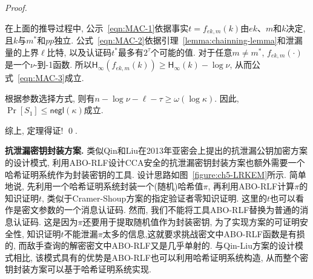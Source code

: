 \begin{proof}
\begin{trivlist}
在上面的推导过程中, 公示~\eqref{eqn:MAC-1}依据事实$t = f_{ek,m}(k)$由$ek$、$m$和$k$决定, 且$k$与$m^*$和$pp$独立. 公式~\eqref{eqn:MAC-2}依据引理~\ref{lemma:chainning-lemma}和泄漏量的上界$\ell$比特, 以及认证码$t^*$最多有$2^{\tau}$个可能的值. 对于任意$m \neq m^*$, $f_{ek,m}(\cdot)$是一个$\nu$-到-1函数. 所以$\mathsf{H}_{\infty}(f_{ek, m}(k)) \geq \mathsf{H}_{\infty}(k) - \log \nu$, 从而公式~\eqref{eqn:MAC-3}成立. 

根据参数选择方式, 则有$n - \log \nu - \ell - \tau \geq \omega(\log \kappa)$. 因此, $\Pr[S_1] \leq \mathsf{negl}(\kappa)$成立.     
\end{trivlist}
综上, 定理得证! \qed. 
\end{proof}

\medskip\noindent\textbf{抗泄漏密钥封装方案.} 类似Qin和Liu在2013年亚密会上提出的抗泄漏公钥加密方案的设计模式, 利用ABO-RLF设计CCA安全的抗泄漏密钥封装方案也额外需要一个哈希证明系统作为封装密钥的工具. 设计思路如图~\ref{figure:ch5-LRKEM}所示. 简单地说, 先利用一个哈希证明系统封装一个(随机)哈希值$\pi$, 再利用ABO-RLF计算$\pi$的知识证明$t$, 类似于Cramer-Shoup方案的指定验证者零知识证明. 这里的$t$也可以看作是密文参数的一个消息认证码. 然而, 我们不能将工具ABO-RLF替换为普通的消息认证码. 这是因为$\pi$还要用于提取随机值作为封装密钥, 为了实现方案的可证明安全性, 知识证明$t$不能泄漏$\pi$太多的信息,这就要求挑战密文中ABO-RLF函数是有损的, 而敌手查询的解密密文中ABO-RLF又是几乎单射的. 与Qin-Liu方案的设计模式相比, 该模式具有的优势是ABO-RLF也可以利用哈希证明系统构造, 从而整个密钥封装方案可以基于哈希证明系统实现. 

